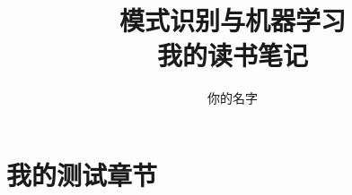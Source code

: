 \documentclass[11pt]{ctexbook}
\title{\textbf{模式识别与机器学习\\我的读书笔记} }
\author{你的名字}
\begin{document}
\maketitle
\chapter{我的测试章节}

\end{document}
